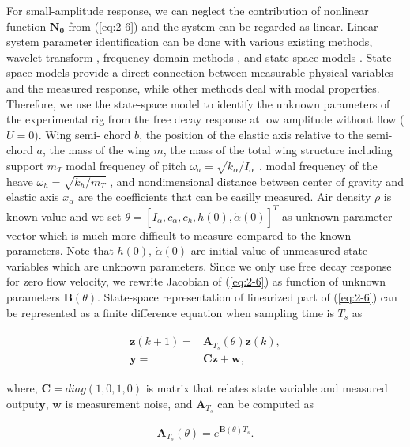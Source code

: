 \documentclass[openacc]{rsproca_new}%
\def\vec#1{\ensuremath{\mathbf{#1}}}
\newcommand{\Eref}[1]{(\ref{#1})}
\begin{document}
For small-amplitude response, we can neglect the contribution of nonlinear function $\vec{N_0}$ from \Eref{eq:2-6} and the system can be regarded as linear. Linear system parameter identification can be done with various existing methods, wavelet transform \cite{ruzzene1997natural}, frequency-domain methods \cite{pintelon2012system}, and state-space models \cite{ljung2001system}. State-space models provide a direct connection between measurable physical variables and the measured response, while other methods deal with modal properties. Therefore, we use the state-space model to identify the unknown parameters of the experimental rig from the free decay response at low amplitude without flow ($U=0$). Wing semi- chord $b$, the position of the elastic axis relative to the semi-chord $a$, the mass of the wing $m$, the mass of the total wing structure including support $m_T$
modal frequency of pitch $\omega_a=\sqrt{k_\alpha / I_\alpha}$ , modal frequency of the heave $\omega_h=\sqrt{k_h/m_T}$ , and nondimensional distance between center of gravity and elastic axis $x_\alpha$ are the coefficients that can be easilly measured.
Air density $\rho$ is known value and we set $\theta=[I_\alpha,c_\alpha,c_h,\dot h(0),\dot \alpha(0)]^T$ as unknown parameter vector which is much more difficult to measure compared to the known parameters. Note that $\dot h(0)$, $\dot \alpha(0)$ are initial value of unmeasured state variables which are unknown parameters. Since we only use free decay response for zero flow velocity, we rewrite Jacobian of \Eref{eq:2-6} as function of unknown parameters $\vec{B}(\theta)$. State-space representation of linearized part of \Eref{eq:2-6} can be represented as a finite difference equation when sampling time is $T_s$ as

\begin{align}\label{eq:2-7}
  \begin{split}
\vec{z}(k+1)=&\vec{A}_{T_s}(\theta)\vec{z}(k),\\
\vec{y}=&\vec{C}\vec{z}+\vec{w},
\end{split}
\end{align}

\noindent where, $\vec{C}=diag(1,0,1,0)$ is matrix that relates state variable and measured output$\vec{y}$, $\vec{w}$ is measurement noise, and $\vec{A}_{T_s}$ can be computed as

\begin{align}\label{eq:2-8}
\vec{A}_{T_s}(\theta)=e^{\vec{B}(\theta)T_s}.
\end{align}
\end{document}
